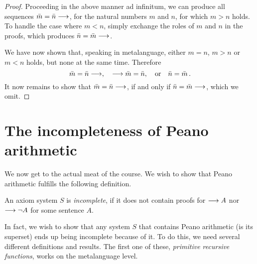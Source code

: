 \documentclass[11pt,a4paper]{article}
\begin{document}
\begin{proof}
    Proceeding in the above manner ad infinitum,
    we can produce all sequences \(\bar m=\bar n\longrightarrow\),
    for the natural numbers \(m\) and \(n\), for which \(m > n\) holds.
    To handle the case where \(m < n\), simply exchange the roles
    of \(m\) and \(n\) in the proofs, which produces \(\bar n=\bar m\longrightarrow\).

    We have now shown that, speaking in metalanguage,
    either \(m=n\), \(m>n\) or \(m < n\) holds,
    but none at the same time. Therefore
    \begin{equation*}
        \bar m = \bar n\longrightarrow,\quad
        \longrightarrow\bar m=\bar n,
        \quad\text{or}\quad
        \bar n=\bar m\,.
    \end{equation*}
    It now remains to show that \(\bar m=\bar n\longrightarrow\),
    if and only if \(\bar n=\bar m\longrightarrow\), which we omit.
\end{proof}

\section{The incompleteness of Peano arithmetic}

We now get to the actual meat of the course.
We wish to show that Peano arithmetic \PA{}
fulfills the following definition.

\begin{definition}\label{def:incompleteness}
    An axiom system \(S\) is \emph{incomplete},
    if it does not contain proofs for
    \(\longrightarrow A\) nor \(\longrightarrow\lnot A\) for some sentence \(A\).
\end{definition}

In fact, we wish to show that any system \(S\) that contains
Peano arithmetic (is its superset) ends up being incomplete because of it.
To do this, we need several different definitions and results.
The first one of these, \emph{primitive recursive functions},
works on the metalanguage level.
\end{document}
